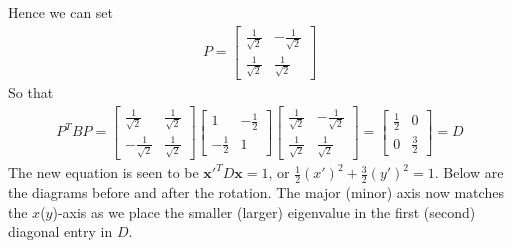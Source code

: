 Hence we can set 
\begin{align*}
P =
\begin{bmatrix}
\frac{1}{\sqrt{2}} & -\frac{1}{\sqrt{2}} \\
\frac{1}{\sqrt{2}} & \frac{1}{\sqrt{2}}
\end{bmatrix}
\end{align*}
So that
\begin{align*}
P^T BP = 
\begin{bmatrix}
\frac{1}{\sqrt{2}} & \frac{1}{\sqrt{2}} \\
-\frac{1}{\sqrt{2}} & \frac{1}{\sqrt{2}}
\end{bmatrix}
\begin{bmatrix}
1 & -\frac{1}{2} \\
-\frac{1}{2} & 1
\end{bmatrix}
\begin{bmatrix}
\frac{1}{\sqrt{2}} & -\frac{1}{\sqrt{2}} \\
\frac{1}{\sqrt{2}} & \frac{1}{\sqrt{2}}
\end{bmatrix}
=
\begin{bmatrix}
\frac{1}{2} & 0\\
0 & \frac{3}{2}
\end{bmatrix}
= D
\end{align*}
The new equation is seen to be $\textbf{x}'^T D\textbf{x} = 1$, or $\frac{1}{2}(x')^2 + \frac{3}{2}(y')^2 = 1$. Below are the diagrams before and after the rotation. The major (minor) axis now matches the $x$($y$)-axis as we place the smaller (larger) eigenvalue in the first (second) diagonal entry in $D$.

